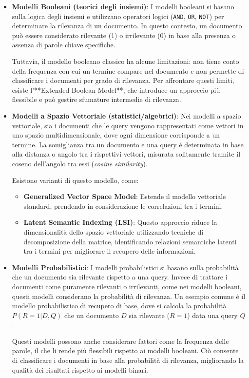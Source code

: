 \documentclass{report}
\begin{document}
	\begin{itemize}
		\item \textbf{Modelli Booleani (teorici degli insiemi)}: 
		I modelli booleani si basano sulla logica degli insiemi e utilizzano operatori logici (\texttt{AND}, \texttt{OR}, \texttt{NOT}) per determinare la rilevanza di un documento. In questo contesto, un documento può essere considerato rilevante (1) o irrilevante (0) in base alla presenza o assenza di parole chiave specifiche.
		
		Tuttavia, il modello booleano classico ha alcune limitazioni: non tiene conto della frequenza con cui un termine compare nel documento e non permette di classificare i documenti per grado di rilevanza. Per affrontare questi limiti, esiste l'**Extended Boolean Model**, che introduce un approccio più flessibile e può gestire sfumature intermedie di rilevanza.
	
		\item \textbf{Modelli a Spazio Vettoriale (statistici/algebrici)}: 
		Nei modelli a spazio vettoriale, sia i documenti che le query vengono rappresentati come vettori in uno spazio multidimensionale, dove ogni dimensione corrisponde a un termine. La somiglianza tra un documento e una query è determinata in base alla distanza o angolo tra i rispettivi vettori, misurata solitamente tramite il coseno dell'angolo tra essi (\emph{cosine similarity}).
		
		Esistono varianti di questo modello, come:
		\begin{itemize}
			\item \textbf{Generalized Vector Space Model}: Estende il modello vettoriale standard, prendendo in considerazione le correlazioni tra i termini.
			\item \textbf{Latent Semantic Indexing (LSI)}: Questo approccio riduce la dimensionalità dello spazio vettoriale utilizzando tecniche di decomposizione della matrice, identificando relazioni semantiche latenti tra i termini per migliorare il recupero delle informazioni.
		\end{itemize}
	
		\item \textbf{Modelli Probabilistici}: 
		I modelli probabilistici si basano sulla probabilità che un documento sia rilevante rispetto a una query. Invece di trattare i documenti come puramente rilevanti o irrilevanti, come nei modelli booleani, questi modelli considerano la probabilità di rilevanza. Un esempio comune è il modello probabilistico di recupero di base, dove si calcola la probabilità \(P(R=1|D,Q)\) che un documento \(D\) sia rilevante (\(R=1\)) data una query \(Q\).
		
		Questi modelli possono anche considerare fattori come la frequenza delle parole, il che li rende più flessibili rispetto ai modelli booleani. Ciò consente di classificare i documenti in base alla probabilità di rilevanza, migliorando la qualità dei risultati rispetto ai modelli binari.
	\end{itemize}
	
\end{document}
